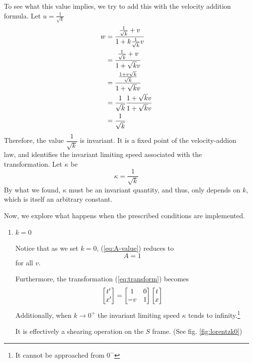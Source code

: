 \documentclass[12pt,a4paper]{article}
\begin{document}
\begin{solution_pset}
		To see what this value implies, we try to add this with the velocity
		addition formula. Let $u = \frac{1}{\sqrt{k}}$
		\begin{align}
		    w
			&=
				\frac{
					\frac{1}{\sqrt{k}} +v
				}{
					1+k\frac{1}{\sqrt{k}}v
				} \notag
				\\
			&=
				\frac{
					\frac{1}{\sqrt{k}} +v
				}{
					1+{\sqrt{k}}v
				} \notag
				\\
			&=
				\frac{
					\frac{1 + v\sqrt{k}}{\sqrt{k}}
				}{
					1+{\sqrt{k}}v
				} \notag
				\\
			&=
				\frac{1}{\sqrt{k}} 
				\frac{
					1+{\sqrt{k}}v
				}{
					1+{\sqrt{k}}v
				} \notag
				\\
			&= 
				\frac{1}{\sqrt{k}} 
		\end{align}
		Therefore, the value $\dfrac{1}{\sqrt{k}}$ is invariant.
		It is a fixed point of the velocity-addion law,
		and identifies the invariant limiting speed associated
		with the transformation.
		Let $\kappa$ be
		\begin{equation}
			\label{eq:kappa}
		    \kappa = \frac{1}{\sqrt k} 
		\end{equation}
		By what we found, $\kappa$ must be an invariant quantity, and thus,
		only depends on $k$, which is itself an arbitrary constant. 
	
		Now, we explore what happens when the prescribed conditions are 
		implemented.
		\begin{enumerate}[(1)]
		    \item $k = 0$

				Notice that as we set $k=0$, (\ref{eq:A-value})
				reduces to
				\begin{equation}
					\label{eq:A-1}
				    A = 1
				\end{equation}
				for all $v$.

				Furthermore, the transformation (\ref{eq:transform}) becomes
				\begin{equation}
					\label{eq:galilean-transform}
				    \bmqty{
				    	t'\\x'
				    } 
					=
					\bmqty{
						1 & 0 \\
						-v & 1
					} 
					\bmqty{
						t\\x
					} 
				\end{equation}
				Additionally, when $k\to 0^+$ the invariant limiting speed $\kappa$ tends to infinity.\footnote{It cannot be approached from $0^-$}

				It is effectively a shearing operation on the $S$ frame. (See fig. \ref{fig:lorentzk0})


\end{enumerate}
\end{solution_pset}
\end{document}
